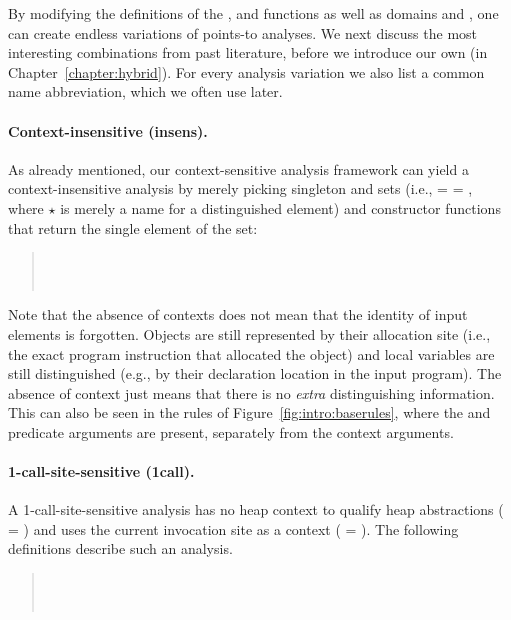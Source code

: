 By modifying the definitions of the ,  and  functions as well as domains  and , one can create endless variations of points-to analyses. We next discuss the most interesting combinations from past literature, before we introduce our own (in Chapter~\ref{chapter:hybrid}). For every analysis variation we also list a common name abbreviation, which we often use later.

\paragraph*{Context-insensitive (insens).}
As already mentioned, our context-sensitive analysis framework can yield a context-insensitive analysis by merely picking singleton  and  sets (i.e.,  =  = \args{\{$\star$\}}, where $\star$ is merely a name for a distinguished element) and constructor functions that return the single element of the set:

\begin{quote}
\\
 \\
\end{quote}

Note that the absence of contexts does not mean that the identity of input elements is forgotten. Objects are still represented by their allocation site (i.e., the exact program instruction that allocated the object) and local variables are still distinguished (e.g., by their declaration location in the input program). The absence of context just means that there is no \emph{extra} distinguishing information. This can also be seen in the rules of Figure~\ref{fig:intro:baserules}, where the  and  predicate arguments are present, separately from the context arguments.

\paragraph*{1-call-site-sensitive (1call).}
A 1-call-site-sensitive analysis has no heap context to qualify heap abstractions ( = \args{\{$\star$\}}) and uses the current invocation site as a context ( = ). The following definitions describe such an analysis.

\begin{quote}
 \\
 \\
\end{quote}

